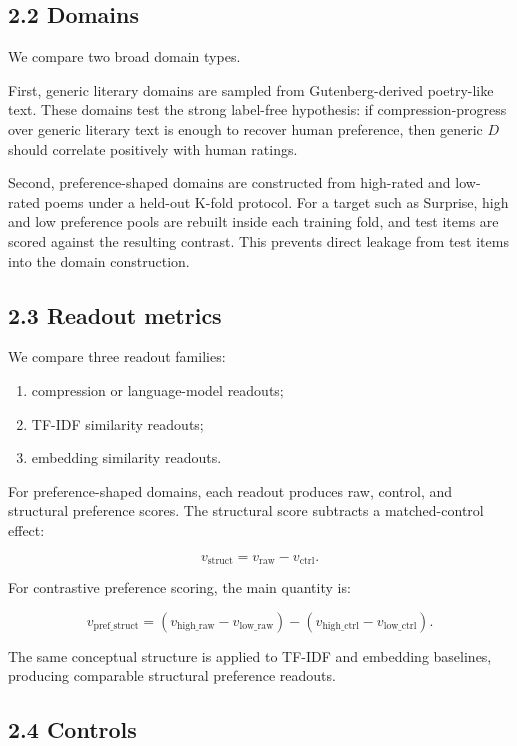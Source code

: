 \documentclass[11pt]{article}
\begin{document}
\subsection{2.2 Domains}

We compare two broad domain types.

First, generic literary domains are sampled from Gutenberg-derived poetry-like text. These domains test the strong label-free hypothesis: if compression-progress over generic literary text is enough to recover human preference, then generic \(D\) should correlate positively with human ratings.

Second, preference-shaped domains are constructed from high-rated and low-rated poems under a held-out K-fold protocol. For a target such as Surprise, high and low preference pools are rebuilt inside each training fold, and test items are scored against the resulting contrast. This prevents direct leakage from test items into the domain construction.

\subsection{2.3 Readout metrics}

We compare three readout families:

\begin{enumerate}
\item compression or language-model readouts;
\item TF-IDF similarity readouts;
\item embedding similarity readouts.
\end{enumerate}

For preference-shaped domains, each readout produces raw, control, and structural preference scores. The structural score subtracts a matched-control effect:

\[
v_{\mathrm{struct}} = v_{\mathrm{raw}} - v_{\mathrm{ctrl}}.
\]

For contrastive preference scoring, the main quantity is:

\[
v_{\mathrm{pref\_struct}}
=
\left(
v_{\mathrm{high\_raw}} - v_{\mathrm{low\_raw}}
\right)
-
\left(
v_{\mathrm{high\_ctrl}} - v_{\mathrm{low\_ctrl}}
\right).
\]

The same conceptual structure is applied to TF-IDF and embedding baselines, producing comparable structural preference readouts.

\subsection{2.4 Controls}
\end{document}
